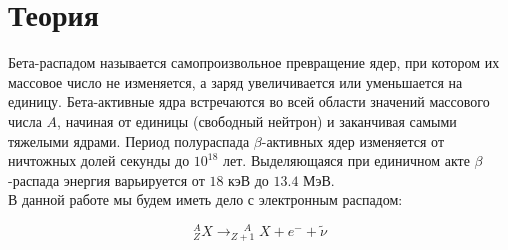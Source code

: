 

\newcommand{\formula}[2]
{
    \begin{equation}\label{#1}
        #2
    \end{equation}
}

\newcommand{\mth}[1]
{
    \begin{math}
        #1
    \end{math}
}

\newcommand{\ruB}[1]
{
    _{\text{#1}}
}

\setcounter{PicsCounter}{1}

\newcommand{\pic}[3]{
    \begin{center}
        \begin{minipage}[h!]{#1}
            \begin{center}

                \texttt{[image: \#2]}
                \textit{Рис \arabic{PicsCounter}. #3}

            \end{center}
        \end{minipage}
    \end{center}

    \stepcounter{PicsCounter}
}

\setcounter{TablesCounter}{1}

\newcommand{\tableLable}[1]{
    \textit{Таблица \arabic{TablesCounter}: #1}

    \stepcounter{TablesCounter}
}

\section{Теория}

Бета-распадом называется самопроизвольное превращение ядер, при котором их
массовое число не изменяется, а заряд увеличивается или уменьшается на единицу.
Бета-активные ядра встречаются во всей области значений массового числа $ A $,
начиная от единицы (свободный нейтрон) и заканчивая самыми тяжелыми ядрами. Период
полураспада $ \beta $-активных ядер изменяется от ничтожных долей секунды до
$ 10^{18} $ лет. Выделяющаяся при единичном акте $\beta$-распада энергия
варьируется от $ 18 $ кэВ до $ 13.4 $ МэВ. \\

В данной работе мы будем иметь дело с электронным распадом:
\formula{ElectronicDecay}{
    ^A_ZX \rightarrow ^{\; \; \; \; \:A}_{Z + 1}X + e^{ -} + \widetilde{\nu}
}

